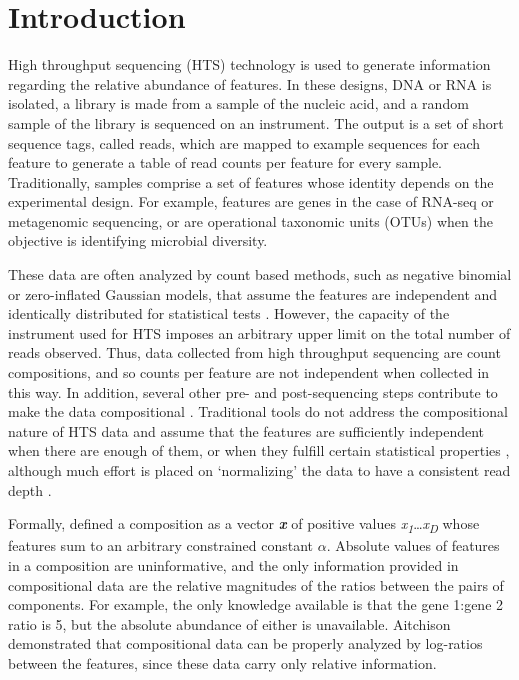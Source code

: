 \documentclass[10pt]{article}
\begin{document}
\vskip 1cm

\newpage

\section{Introduction}
\vskip-0.25cm High throughput sequencing (HTS) technology is used to generate information regarding the relative abundance of features.  In these designs, DNA or RNA is isolated, a library is made from a  sample of the nucleic acid, and a random sample of the library is sequenced on an instrument. The output is a set of short sequence tags, called reads, which are mapped to example sequences for each feature to generate a table of read counts per feature for every sample. Traditionally, samples comprise a set of features whose identity depends on the experimental design. For example, features are genes in the case of RNA-seq or  metagenomic sequencing, or are operational taxonomic units (OTUs) when the objective is identifying microbial diversity. 

These data are often analyzed by count based methods, such as negative binomial or zero-inflated Gaussian models, that assume the features are independent and identically distributed for statistical tests . However,  the capacity of the instrument used for HTS imposes an arbitrary upper limit on the total number of reads observed. Thus, data collected from high throughput sequencing are count compositions, and so counts per feature are not independent when collected in this way. In addition, several other pre- and post-sequencing steps contribute to make the data compositional . Traditional tools do not address the compositional nature of HTS data  and assume that the features are sufficiently independent when there are enough of them, or when they fulfill certain statistical properties , although much effort is placed on `normalizing' the data to have a consistent read depth .

Formally,  defined a composition as a vector \textit{\textbf{x}}  of positive values \textit{x\textsubscript{1}}\ldots\textit{x\textsubscript{D}} whose features  sum to an arbitrary constrained constant $\alpha$. Absolute values of features in a composition are uninformative, and the only information provided in compositional data are the relative magnitudes of the ratios between the pairs of components. For example, the only knowledge available is that the gene 1:gene 2 ratio is 5, but the absolute abundance of either is unavailable.  Aitchison demonstrated that compositional data  can be properly analyzed by log-ratios between the features, since these data carry only relative information.
\end{document}
